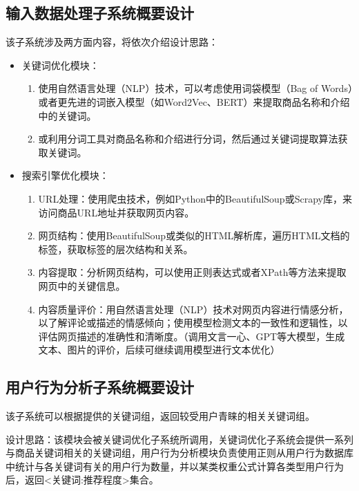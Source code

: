 \documentclass[11pt, a4paper, oneside]{ctexbook}
\begin{document}
\subsection{输入数据处理子系统概要设计}
该子系统涉及两方面内容，将依次介绍设计思路：
\begin{itemize}
    \item 关键词优化模块：
          \begin{enumerate}
              \item 使用自然语言处理（NLP）技术，可以考虑使用词袋模型（Bag of Words）或者更先进的词嵌入模型（如Word2Vec、BERT）来提取商品名称和介绍中的关键词。
              \item 或利用分词工具对商品名称和介绍进行分词，然后通过关键词提取算法获取关键词。
          \end{enumerate}
    \item 搜索引擎优化模块：
          \begin{enumerate}
              \item URL处理：使用爬虫技术，例如Python中的BeautifulSoup或Scrapy库，来访问商品URL地址并获取网页内容。
              \item 网页结构：使用BeautifulSoup或类似的HTML解析库，遍历HTML文档的标签，获取标签的层次结构和关系。
              \item 内容提取：分析网页结构，可以使用正则表达式或者XPath等方法来提取网页中的关键信息。
              \item 内容质量评价：用自然语言处理（NLP）技术对网页内容进行情感分析，以了解评论或描述的情感倾向；使用模型检测文本的一致性和逻辑性，以评估网页描述的准确性和清晰度。（调用文言一心、GPT等大模型，生成文本、图片的评价，后续可继续调用模型进行文本优化）
          \end{enumerate}
\end{itemize}

\subsection{用户行为分析子系统概要设计}
该子系统可以根据提供的关键词组，返回较受用户青睐的相关关键词组。

设计思路：该模块会被关键词优化子系统所调用，关键词优化子系统会提供一系列与商品关键词相关的关键词组，用户行为分析模块负责使用正则从用户行为数据库中统计与各关键词有关的用户行为数量，并以某类权重公式计算各类型用户行为后，返回<关键词:推荐程度>集合。
\end{document}
